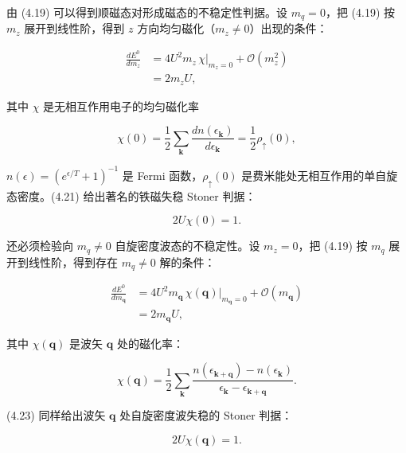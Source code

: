 由 (4.19) 可以得到顺磁态对形成磁态的不稳定性判据。设 $m_{q}=0$，把 (4.19) 按 $m_{z}$ 展开到线性阶，得到 $z$ 方向均匀磁化（$m_{z}\neq0$）出现的条件：

\begin{align*}
\frac {d E ^ {0}}{d m _ {z}} & = 4 U ^ {2} m _ {z} \, \chi \big| _ {m _ {z} = 0} + \mathcal {O} ( m _ {z} ^ {2} )\\
& = 2 m _ {z} U,
\tag{4.20}
\end{align*}

其中 $\chi$ 是无相互作用电子的均匀磁化率

\begin{equation*}
\chi ( 0 ) = \frac {1}{2} \sum_ {\mathbf {k}} \frac {d n ( \epsilon_ {\mathbf {k}} )}{d \epsilon_ {\mathbf {k}}} = \frac {1}{2} \rho_ {\uparrow} ( 0 ),
\tag{4.21}
\end{equation*}

$n(\epsilon) = (e^{\epsilon/T} + 1)^{-1}$ 是 Fermi 函数，$\rho_{\uparrow}(0)$ 是费米能处无相互作用的单自旋态密度。(4.21) 给出著名的铁磁失稳 Stoner 判据：

\begin{equation*}
2 U \chi ( 0 ) = 1.
\tag{4.22}
\end{equation*}

还必须检验向 $m_{q} \neq 0$ 自旋密度波态的不稳定性。设 $m_{z} = 0$，把 (4.19) 按 $m_{q}$ 展开到线性阶，得到存在 $m_{q} \neq 0$ 解的条件：

\begin{align*}
\frac {d E ^ {0}}{d m _ {\mathbf {q}}} & = 4 U ^ {2} m _ {\mathbf {q}} \, \chi ( \mathbf {q} ) \big| _ {m _ {\mathbf {q}} = 0} + \mathcal {O} ( m _ {\mathbf {q}} )\\
& = 2 m _ {\mathbf {q}} U,
\tag{4.23}
\end{align*}

其中 $\chi(\mathbf{q})$ 是波矢 $\mathbf{q}$ 处的磁化率：

\begin{equation*}
\chi ( \mathbf {q} ) = \frac {1}{2} \sum_ {\mathbf {k}} \frac {n \left( \epsilon_ {\mathbf {k} + \mathbf {q}} \right) - n \left( \epsilon_ {\mathbf {k}} \right)}{\epsilon_ {\mathbf {k}} - \epsilon_ {\mathbf {k} + \mathbf {q}}}.
\tag{4.24}
\end{equation*}

(4.23) 同样给出波矢 $\mathbf{q}$ 处自旋密度波失稳的 Stoner 判据：

\begin{equation*}
2 U \chi ( \mathbf {q} ) = 1.
\tag{4.25}
\end{equation*}


